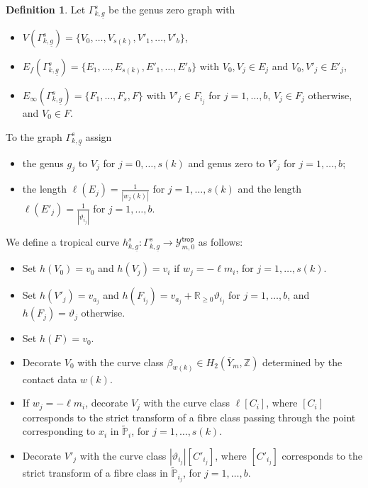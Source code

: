 \documentclass[11pt]{amsart}
\numberwithin{equation}{section}
\theoremstyle{plain}
\theoremstyle{remark}
\theoremstyle{definition}
\newtheorem{definition}[theorem]{Definition}
\newcommand{\cY}{\mathcal{Y}}
\newcommand{\PP}{\mathbb{P}}
\newcommand{\RR}{\mathbb{R}}
\newcommand{\ZZ}{\mathbb{Z}}
\begin{document}
\begin{definition}
 Let $\Gamma_{k,\underline{g}}^s$ be the genus zero graph with
   \begin{itemize}
       \item $V(\Gamma_{k,\underline{g}}^s) = \{V_0,\dots,V_{s(k)},V'_{1},\dots,V'_{b}\}$,
       \item $E_{f}(\Gamma_{k,\underline{g}}^s) = \{E_1,\dots,E_{s(k)},E'_1,\dots,E'_b\}$ with $V_0,V_j \in E_j$  and $V_0,V'_j \in E'_j$,
       \item $E_{\infty}(\Gamma_{k,\underline{g}}^s) = \{F_1,\dots,F_s,F\}$ with $V'_j \in F_{i_{j}}$ for $j=1,\dots,b$, $V_j \in F_j $ otherwise, and $V_0 \in F$.
\end{itemize}
To the graph $\Gamma^{s}_{k,\underline{g}}$ assign
\begin{itemize}
       \item the genus $g_j$ to $V_j$ for $j=0,\dots,s(k)$ and genus zero to $V'_j$ for $j=1,\dots,b$;
       \item the length $ \ell(E_j) = \frac{1}{|w_{j}(k)|}$ for $j=1,\dots,s(k)$ and the length $\ell(E'_j) = \frac{1}{|\vartheta_{i_j}|}$ for $j=1,\dots,b$.
\end{itemize}
We define a tropical curve $h_{k,\underline{g}}^s \colon \Gamma^s_{k,\underline{g}} \rightarrow \cY^{\mathsf{trop}}_{m,0}$ as follows: 
\begin{itemize}
    \item Set $h(V_0) = v_0$ and $h(V_j) = v_i$ if $w_{j} = -\ell m_i$, for $j=1,\dots,s(k)$.
    \item Set $h(V'_j) = v_{a_{j}}$ and $h(F_{i_j}) = v_{a_{j}} + \RR_{\geq 0} \vartheta_{i_j}$ for $j=1,\dots, b$, and $h(F_j) = \vartheta_j$ otherwise.
    \item Set $h(F)= v_0$.
    \item Decorate $V_0$ with the curve class $\beta_{w(k)} \in H_{2}(\overline{Y}_m,\ZZ)$ determined by the contact data $w(k)$.
    \item If $w_{j} = -\ell m_i$, decorate $V_{j}$ with the curve class $\ell [C_i]$, where $[C_i]$ corresponds to the strict transform of a fibre class passing through the point corresponding to $x_i$ in $\tilde{\PP}_i$, for $j=1,\dots,s(k)$.
    \item Decorate $V'_j$ with the curve class $|\vartheta_{i_j}|[C'_{i_j}]$, where $[C'_{i_j}]$ corresponds to the strict transform of a fibre class in $\tilde{\PP}_{i_j}$, for $j=1,\dots,b$.
\end{itemize} 
\end{definition}
\end{document}

